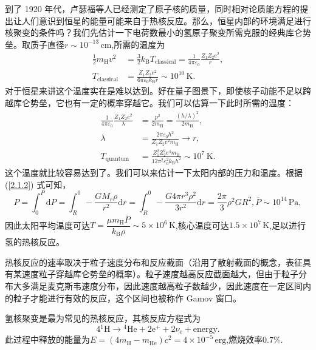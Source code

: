 \documentclass[../天体物理基础.tex]{subfiles}
\begin{document}
到了 1920 年代，卢瑟福等人已经测定了原子核的质量，同时相对论质能方程的提出让人们意识到恒星的能量可能来自于热核反应。那么，恒星内部的环境满足进行核聚变的条件吗？我们先估计一下电荷数最小的氢原子聚变所需克服的经典库仑势垒。取质子直径$r\sim10^{-13}\,\mathrm{cm}$,所需的温度为
\begin{align}
\frac{1}{2}m_{\mathrm{H}}v^{2}&=\frac{3}{2}k_{\text{B}}T_{\text{classical}}=\frac{1}{4\pi\varepsilon_{0}}\frac{Z_{1}Z_{2}e^{2}}{r},\\
T_{\text{classical}}&=\frac{Z_{1}Z_{2}e^{2}}{6\pi\varepsilon_{0}k_{\text{B}}r}\sim10^{10}\,\mathrm{K}.
\end{align}
对于恒星来讲这个温度实在是难以达到。好在量子图景下，即使核子动能不足以跨越库仑势垒，它也有一定的概率穿越它。我们可以估算一下此时所需的温度：
\begin{align}
\frac{1}{4\pi\varepsilon_{0}}\frac{Z_{1}Z_{2}e^{2}}{\lambda}&=\frac{p^{2}}{2m_{\mathrm{H}}}=\frac{\left(h/\lambda\right)^{2}}{2m_{\mathrm{H}}},\\
\lambda&=\frac{2\pi\varepsilon_{0}h^{2}}{Z_{1}Z_{2}e^{2}m_{\mathrm{H}}}\to r,\\
T_{\text{quantum}}&=\frac{Z_{1}^{2}Z_{2}^{2}e^{4}m_{\mathrm{H}}}{12\pi^{2}\varepsilon_{0}^{2}k_{\text{B}}h^{2}}\sim10^{7}\,\mathrm{K}.
\end{align}
这个温度就比较容易达到了。我们可以来估计一下太阳内部的压力和温度。根据 (\ref{2.1.2}) 式可知，
\begin{equation}
P=\int_{0}^{P}\mathrm{d}P=\int_{R}^{0}-\frac{GM_{r}\rho}{r^{2}}\mathrm{d}r=\int_{R}^{0}-\frac{G4\pi{}r^{3}\rho^{2}}{3r^{2}}\mathrm{d}r=\frac{2\pi{}}{3}\rho^{2}GR^{2},\overline{P}\sim10^{14}\,\mathrm{Pa},
\end{equation}
因此太阳平均温度可达$T=\dfrac{\mu m_{\mathrm{H}}\overline{P}}{k_{\text{B}}\rho}\sim5\times10^{6}\,\mathrm{K}$,核心温度可达$1.5\times10^{7}\,\mathrm{K}$,足以进行氢的热核反应。

热核反应的速率取决于粒子速度分布和反应截面（沿用了散射截面的概念，表征具有某速度粒子穿越库仑势垒的概率）。粒子速度越高反应截面越大，但由于粒子分布大多满足麦克斯韦速度分布，因此速度越高粒子数越少，因此速度在一定区间内的粒子才能进行有效的反应，这个区间也被称作 Gamov 窗口。

氢核聚变是最为常见的热核反应，其核反应方程式为
\begin{equation}
4{}^{1}\mathrm{H}\to{}^{4}\mathrm{He}+2\mathrm{e}^{+}+2\nu_{\mathrm{e}}+\text{energy}.
\end{equation}
此过程中释放的能量为$E=\left(4m_{\mathrm{H}}-m_{\mathrm{He}}\right)c^{2}=4\times10^{-5}\,\mathrm{erg}$,燃烧效率$0.7\%$.
\end{document}
